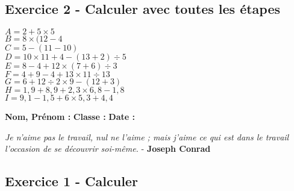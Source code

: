 \documentclass[11pt]{article}
\begin{document}
\subsection*{Exercice 2 - Calculer avec toutes les étapes}

\begin{multicols}{3}
  \noindent
  $A = 2+5\times 5 $\\
  $B = 8 \times (12 - 4 $\\
  $C = 5-(11-10) $\\
  $D = 10\times 11+4-(13+2)\div 5 $\\
  $E = 8-4+12\times (7+6)\div 3 $\\
  $F = 4+9-4+13\times 11\div 13 $\\
  $G = 6+12\div 2\times 9-(12+3) $\\
  $H = 1{,}9+8{,}9+2{,}3\times 6{,}8-1{,}8 $\\
  $I = 9{,}1-1{,}5+6\times 5{,}3+4{,}4$
\end{multicols}

\vspace{4cm}

\textbf{Nom, Prénom :} \hspace{8cm} \textbf{Classe :} \hspace{3cm} \textbf{Date :}\\
\vspace{-0.8cm}
\begin{center}
  \textit{Je n'aime pas le travail, nul ne l'aime ; mais j'aime ce qui est dans le travail l'occasion de se découvrir soi-même.}  - \textbf{Joseph Conrad}
\end{center}
\vspace{-0.8cm}

\subsection*{Exercice 1 - Calculer}
\end{document}
